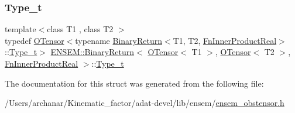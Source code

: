 \subsubsection{\texorpdfstring{Type\_t}{Type\_t}\hspace{0.1cm}{\footnotesize\ttfamily [3/3]}}
{\footnotesize\ttfamily template$<$class T1 , class T2 $>$ \\
typedef \mbox{\hyperlink{classENSEM_1_1OTensor}{O\+Tensor}}$<$typename \mbox{\hyperlink{structENSEM_1_1BinaryReturn}{Binary\+Return}}$<$T1, T2, \mbox{\hyperlink{structENSEM_1_1FnInnerProductReal}{Fn\+Inner\+Product\+Real}}$>$\+::\mbox{\hyperlink{structENSEM_1_1BinaryReturn_3_01OTensor_3_01T1_01_4_00_01OTensor_3_01T2_01_4_00_01FnInnerProductReal_01_4_a4be584e269222cdb3c377aa0b77b45e3}{Type\+\_\+t}}$>$ \mbox{\hyperlink{structENSEM_1_1BinaryReturn}{E\+N\+S\+E\+M\+::\+Binary\+Return}}$<$ \mbox{\hyperlink{classENSEM_1_1OTensor}{O\+Tensor}}$<$ T1 $>$, \mbox{\hyperlink{classENSEM_1_1OTensor}{O\+Tensor}}$<$ T2 $>$, \mbox{\hyperlink{structENSEM_1_1FnInnerProductReal}{Fn\+Inner\+Product\+Real}} $>$\+::\mbox{\hyperlink{structENSEM_1_1BinaryReturn_3_01OTensor_3_01T1_01_4_00_01OTensor_3_01T2_01_4_00_01FnInnerProductReal_01_4_a4be584e269222cdb3c377aa0b77b45e3}{Type\+\_\+t}}}



The documentation for this struct was generated from the following file\+:\begin{DoxyCompactItemize}
\item 
/\+Users/archanar/\+Kinematic\+\_\+factor/adat-\/devel/lib/ensem/\mbox{\hyperlink{adat-devel_2lib_2ensem_2ensem__obstensor_8h}{ensem\+\_\+obstensor.\+h}}\end{DoxyCompactItemize}
